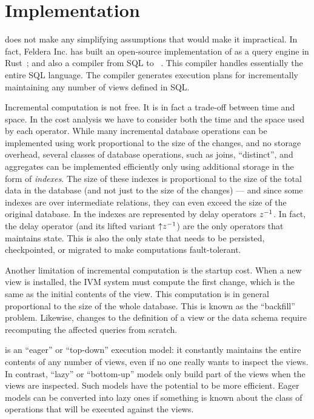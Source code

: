 \section{Implementation}\label{sec:implementation}


\dbsp does not make any simplifying assumptions that would make it
impractical.  In fact, Feldera Inc. has built an open-source
implementation of \dbsp as a query engine in Rust~\cite{dbsp-crate};
and also a compiler from SQL to \dbsp~\cite{sql-to-dbsp-compiler}.
This compiler handles essentially the entire SQL language.  The
compiler generates execution plans for incrementally maintaining any
number of views defined in SQL.

Incremental computation is not free.  It is in fact a trade-off
between time and space.  In the cost analysis we have to consider both
the time and the space used by each operator.  While many incremental
database operations can be implemented using work proportional to the
size of the changes, and no storage overhead, several classes of
database operations, such as joins, ``distinct'', and aggregates can
be implemented efficiently only using additional storage in the form
of \emph{indexes}.  The size of these indexes is proportional to the
size of the total data in the database (and not just to the size of
the changes) --- and since some indexes are over intermediate
relations, they can even exceed the size of the original database.  In
\dbsp the indexes are represented by delay operators $z^{-1}$.  In fact,
the delay operator (and its lifted variant ${\uparrow}z^{-1}$) are the only
operators that maintains state.  This is also the only state that
needs to be persisted, checkpointed, or migrated to make \dbsp
computations fault-tolerant.

Another limitation of incremental computation is the startup cost.
When a new view is installed, the IVM system must compute the first
change, which is the same as the initial contents of the view.  This
computation is in general proportional to the size of the whole
database.  This is known as the ``backfill'' problem.  Likewise,
changes to the definition of a view or the data schema require
recomputing the affected queries from scratch.

\dbsp is an ``eager'' or ``top-down'' execution model: it constantly
maintains the entire contents of any number of views, even if no one
really wants to inspect the views.  In contrast, ``lazy'' or
``bottom-up'' models only build part of the views when the views are
inspected.  Such models have the potential to be more efficient.
Eager models can be converted into lazy ones if something is known
about the class of operations that will be executed against the views.

